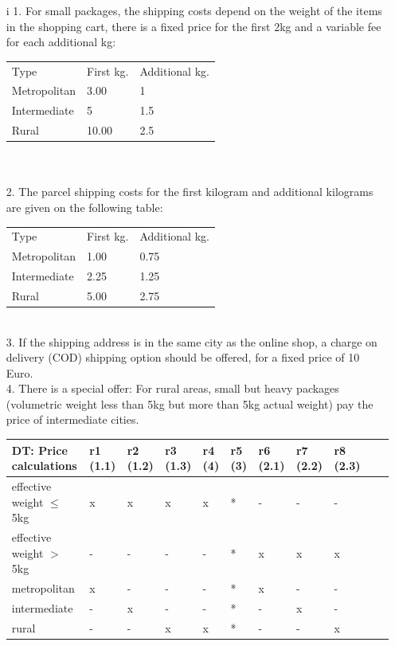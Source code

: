 \documentclass{scrartcl}
\begin{document}
\begin{itemize}
	\item[i]
	1. For small packages, the shipping costs depend on the weight of the items in the shopping cart, there is a fixed price for the first 2kg and a variable fee for each additional kg:\\
	\begin{tabular} {l l l}
		Type & First kg. &     Additional kg.\\
		Metropolitan &     3.00 &     1\\
		Intermediate &     5 &     1.5\\
		Rural &     10.00 &     2.5
	\end{tabular}\\\\
	2. The parcel shipping costs for the first kilogram and additional kilograms are given on the following
	table:\\
	\begin{tabular} {l l l}
		Type & First kg. &     Additional kg.\\
		Metropolitan &     1.00 &     0.75\\
		Intermediate &     2.25 &     1.25\\
		Rural &     5.00 &     2.75
	\end{tabular}\\
	3. If the shipping address is in the same city as the online shop, a charge on delivery (COD) shipping option should be offered, for a fixed price of 10 Euro.\\
	4. There is a special offer: For rural areas, small but heavy packages (volumetric weight less than 5kg but more than 5kg actual weight) pay the price of intermediate cities.\\
	\begin{adjustwidth}{-4em}{-4em}
		\begin{tabular}{|p{10em} || p{2.5em} | p{3em} | p{3em} | p{3em} | p{1em} | p{3em} | p{3em} | p{3em} | p{3em} | p{4em} |}
			\hline
			DT: Price calculations & r1 (1.1)& r2 (1.2)& r3 (1.3)& r4 (4)& r5 (3)& r6 (2.1)& r7 (2.2)& r8 (2.3)\\
			\hline \hline
			effective weight $\leq$ 5kg &x&x&x&x&*&-&-&-\\
			\hline
			effective weight $>$ 5kg &-&-&-&-&*&x&x&x\\
			\hline
			metropolitan&x&-&-&-&*&x&-&-\\
			\hline
			intermediate&-&x&-&-&*&-&x&-\\
			\hline
			rural&-&-&x&x&*&-&-&x\\

\end{tabular}
\end{adjustwidth}
\end{itemize}
\end{document}
